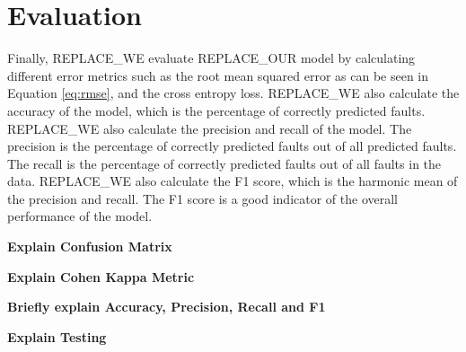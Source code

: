 \section{Evaluation}
\label{sec:model_evaluation}

Finally, REPLACE_WE evaluate REPLACE_OUR model by calculating different error metrics such as the root mean squared error as can be seen in Equation \ref{eq:rmse}, and the cross entropy loss. REPLACE_WE also calculate the accuracy of the model, which is the percentage of correctly predicted faults. REPLACE_WE also calculate the precision and recall of the model. The precision is the percentage of correctly predicted faults out of all predicted faults. The recall is the percentage of correctly predicted faults out of all faults in the data. REPLACE_WE also calculate the F1 score, which is the harmonic mean of the precision and recall. The F1 score is a good indicator of the overall performance of the model.


\textbf{Explain Confusion Matrix}

\textbf{Explain Cohen Kappa Metric}

\textbf{Briefly explain Accuracy, Precision, Recall and F1}

\textbf{Explain Testing}